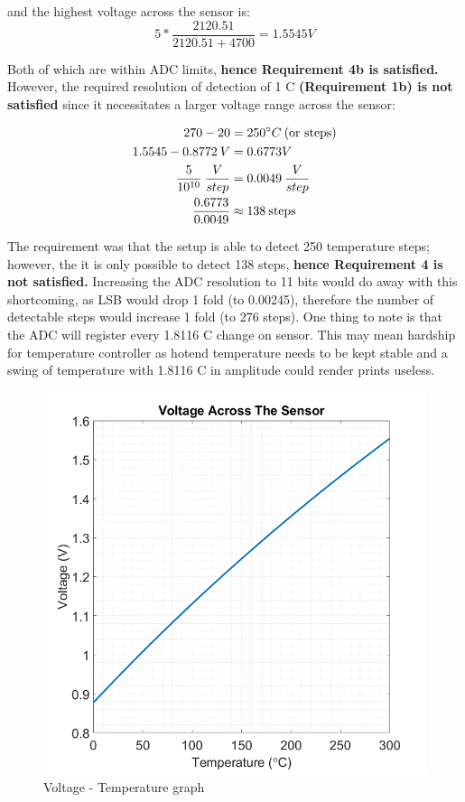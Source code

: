 and the highest voltage across the sensor is:
\begin{equation}
    5*\frac{2120.51}{2120.51+4700}= 1.5545 V
\end{equation}

Both of which are within ADC limits, \textbf{hence Requirement 4b is satisfied.} However, the required resolution of detection of 1 \degree C \textbf{(Requirement 1b) is not satisfied} since it necessitates a larger voltage range across the sensor:

\begin{align}
    270 - 20 &= 250 \degree C \: \text{(or steps)}\\
    1.5545 - 0.8772 \: V &= 0.6773 V\\
    \frac{5}{10^{10}} \: \frac{V}{step} &= 0.0049 \: \frac{V}{step}\\
    \frac{0.6773}{0.0049} &\approx 138 \: \text{steps}
\end{align}

The requirement was that the setup is able to detect 250 temperature steps; however, the it is only possible to detect 138 steps, \textbf{hence Requirement 4 is not satisfied.} Increasing the ADC resolution to 11 bits would do away with this shortcoming, as LSB would drop 1 fold (to 0.00245), therefore the number of detectable steps would increase 1 fold (to 276 steps). One thing to note is that the ADC will register every 1.8116 \degree C change on sensor. This may mean hardship for temperature controller as hotend temperature needs to be kept stable and a swing of temperature with 1.8116 \degree C in amplitude could render prints useless.

\begin{figure}[H]
    \centering
    \includegraphics[scale=0.45]{pics/ptc_temp_volt}
    \caption{Voltage - Temperature graph}
\end{figure}

